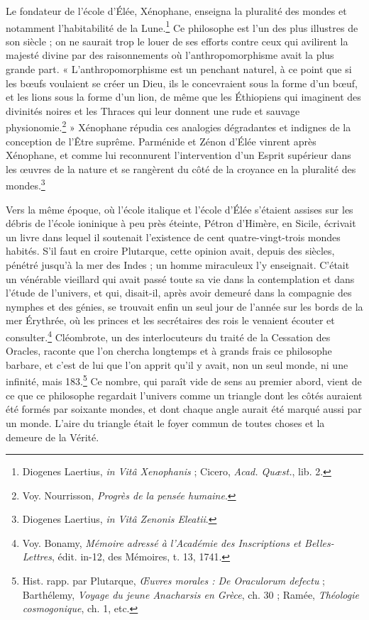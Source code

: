 \documentclass[a4paper, 11pt, oneside]{article}
\begin{document}
Le fondateur de l'école d'Élée, Xénophane, enseigna la pluralité des mondes et notamment l'habitabilité de la Lune.\footnote{Diogenes Laertius, \emph{in Vitâ Xenophanis} ; Cicero, \emph{Acad. Quæst.}, lib. 2.} Ce philosophe est l'un des plus illustres de son siècle ; on ne saurait trop le louer de ses efforts contre ceux qui avilirent la majesté divine par des raisonnements où l'anthropomorphisme avait la plus grande part. « L'anthropomorphisme est un penchant naturel, à ce point que si les bœufs voulaient se créer un Dieu, ils le concevraient sous la forme d'un bœuf, et les lions sous la forme d'un lion, de même que les Éthiopiens qui imaginent des divinités noires et les Thraces qui leur donnent une rude et sauvage physionomie.\footnote{Voy. Nourrisson, \emph{Progrès de la pensée humaine}.} » Xénophane répudia ces analogies dégradantes et indignes de la conception de l'Être suprême. Parménide et Zénon d'Élée vinrent après Xénophane, et comme lui reconnurent l'intervention d'un Esprit supérieur dans les œuvres de la nature et se rangèrent du côté de la croyance en la pluralité des mondes.\footnote{Diogenes Laertius, \emph{in Vitâ Zenonis Eleatii}.}

Vers la même époque, où l'école italique et l'école d'Élée s'étaient assises sur les débris de l'école ioninique à peu près éteinte, Pétron d'Himère, en Sicile, écrivait un livre dans lequel il soutenait l'existence de cent quatre-vingt-trois mondes habités. S'il faut en croire Plutarque, cette opinion avait, depuis des siècles, pénétré jusqu'à la mer des Indes ; un homme miraculeux l'y enseignait. C'était un vénérable vieillard qui avait passé toute sa vie dans la contemplation et dans l'étude de l'univers, et qui, disait-il, après avoir demeuré dans la compagnie des nymphes et des génies, se trouvait enfin un seul jour de l'année sur les bords de la mer Érythrée, où les princes et les secrétaires des rois le venaient écouter et consulter.\footnote{Voy. Bonamy, \emph{Mémoire adressé à l'Académie des Inscriptions et Belles-Lettres}, édit. in-12, des Mémoires, t. 13, 1741.} Cléombrote, un des interlocuteurs du traité de la Cessation des Oracles, raconte que l'on chercha longtemps et à grands frais ce philosophe barbare, et c'est de lui que l'on apprit qu'il y avait, non un seul monde, ni une infinité, mais 183.\footnote{Hist. rapp. par Plutarque, \emph{Œuvres morales : De Oraculorum defectu} ; Barthélemy, \emph{Voyage du jeune Anacharsis en Grèce}, ch. 30 ; Ramée, \emph{Théologie cosmogonique}, ch. 1, etc.} Ce nombre, qui paraît vide de sens au premier abord, vient de ce que ce philosophe regardait l'univers comme un triangle dont les côtés auraient été formés par soixante mondes, et dont chaque angle aurait été marqué aussi par un monde. L'aire du triangle était le foyer commun de toutes choses et la demeure de la Vérité.
\end{document}
